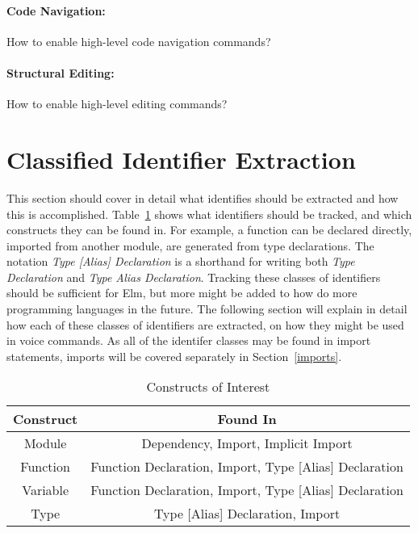 \documentclass[../thesis.tex]{subfiles}
\begin{document}
\paragraph{Code Navigation:}%
\label{code_navigation}
How to enable high-level code navigation commands?

\paragraph{Structural Editing:}%
\label{structural_editing}
How to enable high-level editing commands?

\section{Classified Identifier Extraction}%
\label{sec:classified_identifier_extraction}
This section should cover in detail what identifies should be extracted
and how this is accomplished. Table~\ref{tab:constructs_of_interest} shows
what identifiers should be tracked, and which constructs they can be found in.
For example, a function can be declared directly, imported from another module, are generated
from type declarations. The notation \textit{Type [Alias] Declaration} is a shorthand
for writing both \textit{Type Declaration} and \textit{Type Alias Declaration}.
Tracking these classes of identifiers should be sufficient for Elm, but more
might be added to how do more programming languages in the future.
The following section will explain in detail how each of these classes of identifiers
are extracted, on how they might be used in voice commands.
As all of the identifer classes may be found in import statements, imports will be covered
separately in Section~\ref{imports}.

\begin{table}[htpb]
    \centering
    \caption{Constructs of Interest}
    \label{tab:constructs_of_interest}
    \begin{tabular}{|c|c|}
        \hline
        Construct & Found In \\
        \hline
        Module & Dependency, Import, Implicit Import \\
        Function & Function Declaration, Import, Type [Alias] Declaration \\
        Variable & Function Declaration, Import, Type [Alias] Declaration \\
        Type & Type [Alias] Declaration, Import \\
        \hline
    \end{tabular}
\end{table}
\end{document}
